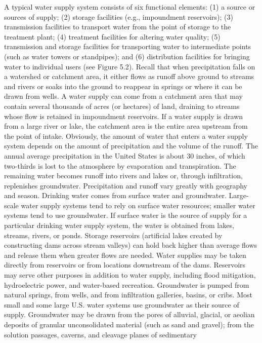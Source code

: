 \documentclass{article}
\begin{document}
A typical water supply system consists of six functional elements: (1) a
source or sources of supply; (2) storage facilities (e.g., impoundment
reservoirs); (3) transmission facilities to transport water from the
point of storage to the treatment plant; (4) treatment facilities for
altering water quality; (5) transmission and storage facilities for
transporting water to intermediate points (such as water towers or
standpipes); and (6) distribution facilities for bringing water to
individual users (see Figure 5.2). Recall that when precipitation falls
on a watershed or catchment area, it either flows as runoff above ground
to streams and rivers or soaks into the ground to reappear in springs or
where it can be drawn from wells. A water supply can come from a
catchment area that may contain several thousands of acres (or hectares)
of land, draining to streams whose flow is retained in impoundment
reservoirs. If a water supply is drawn from a large river or lake, the
catchment area is the entire area upstream from the point of intake.
Obviously, the amount of water that enters a water supply system depends
on the amount of precipitation and the volume of the runoff. The annual
average precipitation in the United States is about 30 inches, of which
two-thirds is lost to the atmosphere by evaporation and transpiration.
The remaining water becomes runoff into rivers and lakes or, through
infiltration, replenishes groundwater. Precipitation and runoff vary
greatly with geography and season. Drinking water comes from surface
water and groundwater. Large-scale water supply systems tend to rely on
surface water resources; smaller water systems tend to use groundwater.
If surface water is the source of supply for a particular drinking water
supply system, the water is obtained from lakes, streams, rivers, or
ponds. Storage reservoirs (artificial lakes created by constructing dams
across stream valleys) can hold back higher than average flows and
release them when greater flows are needed. Water supplies may be taken
directly from reservoirs or from locations downstream of the dams.
Reservoirs may serve other purposes in addition to water supply,
including flood mitigation, hydroelectric power, and water-based
recreation. Groundwater is pumped from natural springs, from wells, and
from infiltration galleries, basins, or cribs. Most small and some large
U.S. water systems use groundwater as their source of supply.
Groundwater may be drawn from the pores of alluvial, glacial, or aeolian
deposits of granular unconsolidated material (such as sand and gravel);
from the solution passages, caverns, and cleavage planes of sedimentary
\end{document}
